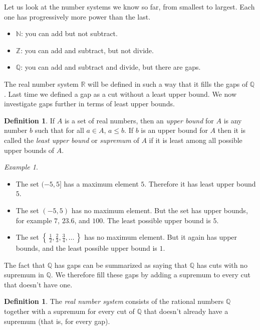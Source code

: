 \documentclass[11pt,oneside]{amsbook}
\newcommand{\set}[1]{\left\{\,#1\,\right\}}
\newcommand{\NN}{\mathbb N}
\newcommand{\ZZ}{\mathbb Z}
\newcommand{\QQ}{\mathbb Q}
\newcommand{\RR}{\mathbb R}
\theoremstyle{definition}
\theoremstyle{plain}
\theoremstyle{definition}
\newtheorem{defn}[thm]{Definition}
\theoremstyle{remark}
\newtheorem{example}[thm]{Example}
\numberwithin{equation}{section}
\numberwithin{figure}{section}
\begin{document}
Let us look at the number systems we know so far, from smallest to largest. Each one has progressively more power than the last.
\begin{itemize}
\item $\NN$: you can add but not subtract.
\item $\ZZ$: you can add and subtract, but not divide.
\item $\QQ$: you can add and subtract and divide, but there are gaps.
\end{itemize}

The real number system $\RR$ will be defined in such a way that it fills the gaps of $\QQ$. Last time we defined a gap as a cut without a least upper bound. We now investigate gaps further in terms of least upper bounds.

\begin{defn}
  If $A$ is a set of real numbers, then an \emph{upper bound} for $A$ is any number $b$ such that for all $a\in A$, $a\leq b$. If $b$ is an upper bound for $A$ then it is called the \emph{least upper bound} or \emph{supremum} of $A$ if it is least among all possible upper bounds of $A$.
\end{defn}

\begin{example}
  \begin{itemize}
  \item The set $(-5,5]$ has a maximum element $5$. Therefore it has least upper bound $5$.
  \item The set $(-5,5)$ has no maximum element. But the set has upper bounds, for example $7$, $23.6$, and $100$. The least possible upper bound is $5$.
  \item The set $\set{\frac12,\frac23,\frac34,\ldots}$ has no maximum element. But it again has upper bounds, and the least possible upper bound is $1$.
  \end{itemize}
\end{example}

The fact that $\QQ$ has gaps can be summarized as saying that $\QQ$ has cuts with no supremum in $\QQ$. We therefore fill these gaps by adding a supremum to every cut that doesn't have one.

\begin{defn}
  The \emph{real number system} consists of the rational numbers $\QQ$ together with a supremum for every cut of $\QQ$ that doesn't already have a supremum (that is, for every gap).
\end{defn}
\end{document}
